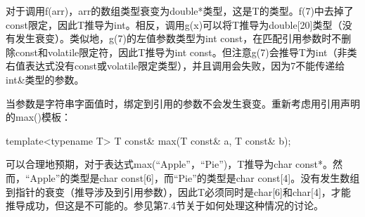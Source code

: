 对于调用f(arr)，arr的数组类型衰变为double*类型，这是T的类型。f(7)中去掉了const限定，因此T推导为int。相反，调用g(x)可以将T推导为double[20]类型（没有发生衰变）。类似地，g(7)的左值参数类型为int const，在匹配引用参数时不删除const和volatile限定符，因此T推导为int const。但注意g(7)会推导T为int（非类右值表达式没有const或volatile限定类型），并且调用会失败，因为7不能传递给int\&类型的参数。

当参数是字符串字面值时，绑定到引用的参数不会发生衰变。重新考虑用引用声明的max()模板：

\begin{cpp}
template<typename T>
T const& max(T const& a, T const& b);
\end{cpp} 

可以合理地预期，对于表达式max(“Apple”，“Pie”)，T推导为char const*。然而，“Apple”的类型是char const[6]，而“Pie”的类型是char const[4]。没有发生数组到指针的衰变（推导涉及到引用参数），因此T必须同时是char[6]和char[4]，才能推导成功，但这是不可能的。参见第7.4节关于如何处理这种情况的讨论。























 